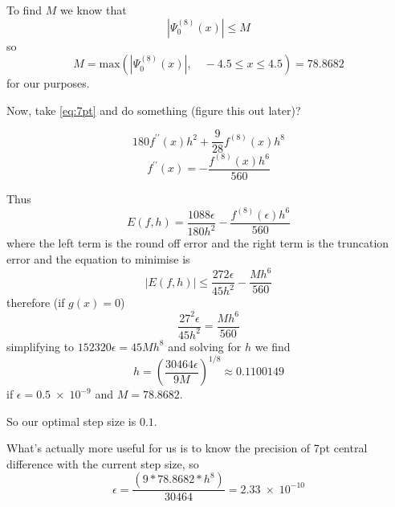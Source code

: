 To find $M$ we know that
\begin{equation}
 \left|\Psi_0^{(8)}(x)\right| \leq M
\end{equation}
so
\begin{equation}
M = \mathrm{max}\left(\left|\Psi_0^{(8)}(x)\right|, \quad -4.5 \leq x \leq 4.5\right) = 78.8682
\end{equation}
for our purposes.


Now, take \cref{eq:7pt} and do something (figure this out later)?

\begin{equation}
180f^{\prime\prime}(x)h^2+\frac{9}{28}f^{(8)}(x)h^8
\end{equation}
\begin{equation}
  f^{\prime\prime}(x)=-\frac{f^{(8)}(x)h^6}{560}
\end{equation}

Thus
\begin{equation}
  E(f,h) = \frac{1088\epsilon}{180h^2}-\frac{f^{(8)}(\epsilon)h^6}{560}
\end{equation}
where the left term is the round off error and the right term is the truncation error and the equation to minimise is
\begin{equation}
  \left|E(f,h)\right| \leq \frac{272\epsilon}{45h^2}-\frac{Mh^6}{560}
\end{equation}
therefore (if $g(x) = 0$)
\begin{equation}
  \frac{27^2\epsilon}{45h^2}=\frac{Mh^6}{560}
\end{equation}
simplifying to $152320\epsilon = 45Mh^8$ and solving for $h$ we find
\begin{equation}
  h = \left(\frac{30464\epsilon}{9M}\right)^{1/8} \approx 0.1100149
\end{equation}
if $\epsilon = 0.5\;\times\;10^{-9}$ and $M = 78.8682$.

So our optimal step size is $0.1$.

What's actually more useful for us is to know the precision of 7pt central difference with the current step size, so
\begin{equation}
\epsilon = \frac{\left(9*78.8682*h^8\right)}{30464} = 2.33\;\times\;10^{-10}
\end{equation} 
